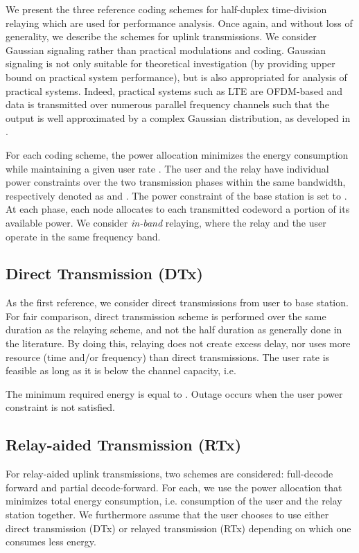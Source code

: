 \documentclass[journal]{IEEEtran}
\theoremstyle{definition}
\begin{document}
We present the three reference coding schemes for half-duplex time-division relaying which are used for performance analysis. Once again, and without loss of generality, we describe the schemes for uplink transmissions.
We consider Gaussian signaling rather than practical modulations and coding.
Gaussian signaling is not only suitable for theoretical investigation (by providing upper bound on practical system performance), but is also appropriated for analysis of practical systems. Indeed, practical systems such as LTE are OFDM-based and data is transmitted over numerous parallel frequency channels such that the output is well approximated by a complex Gaussian distribution, as developed in \cite{book_LTE_Fund, OFDM_Gaussian}.

For each coding scheme, the power allocation minimizes the energy consumption while maintaining a given user rate .
The user and the relay have individual power constraints over the two transmission phases within the same bandwidth, respectively denoted as  and . The power constraint of the base station is set to . At each phase, each node allocates to each transmitted codeword a portion of its available power. We consider \textit{in-band} relaying, where the relay and the user operate in the same frequency band.

\subsection{Direct Transmission (DTx)}

As the first reference, we consider direct transmissions from user to base station. For fair comparison, direct transmission scheme is performed over the same duration as the relaying scheme, and not the half duration as generally done in the literature. By doing this, relaying does not create excess delay, nor uses more resource (time and/or frequency) than direct transmissions.
The user rate  is feasible as long as it is below the channel capacity, i.e.

The minimum required energy is equal to . Outage occurs when the user power constraint  is not satisfied.

\subsection{Relay-aided Transmission (RTx)}

For relay-aided uplink transmissions, two schemes are considered: full-decode forward and partial decode-forward. For each, we use the power allocation that minimizes total energy consumption, i.e. consumption of the user and the relay station together. We furthermore assume that the user chooses to use either direct transmission (DTx) or relayed transmission (RTx) depending on which one consumes less energy.
\end{document}
